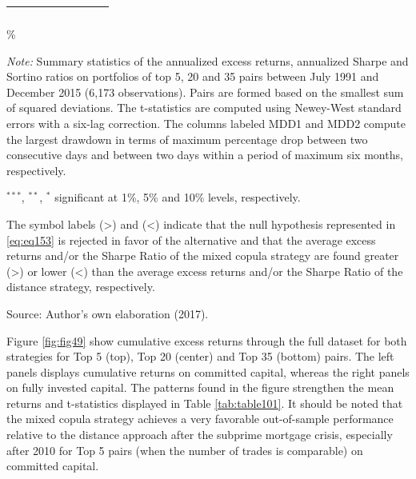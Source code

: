 \documentclass[a4paper,12pt]{report}
\begin{document}
\begin{refsection}
\begin{threeparttable}[H]
\begin{tabularx}{\textwidth}{@{\extracolsep{\fill}}llllllll@{}}
			\multicolumn{1}{r}{} & \multicolumn{1}{r}{} & \multicolumn{1}{r}{} & \multicolumn{1}{r}{} & \multicolumn{1}{r}{} & \multicolumn{1}{r}{} & \multicolumn{1}{r}{} & \multicolumn{1}{r}{} \\
			\bottomrule
		\end{tabularx}\%
		\begin{tablenotes}
			\item \textit{Note:} \scriptsize \tiny Summary statistics of the annualized excess returns, annualized Sharpe and Sortino ratios on portfolios of top 5, 20 and 35 pairs between July 1991 and December 2015 (6,173 observations). Pairs are formed based on the smallest sum of squared deviations. The t-statistics are computed using Newey-West standard errors with a six-lag correction. The columns labeled MDD1 and MDD2 compute the largest drawdown in terms of maximum percentage drop between two consecutive days and between two days within a period of maximum six months, respectively.
			\item \scriptsize $^{\ast\ast\ast}$, $^{\ast\ast}$, $^{\ast}$  significant at 1\%, 5\% and 10\% levels, respectively.
			\item \tiny The symbol labels (>) and (<) indicate that the null hypothesis represented in \ref{eq:eq153} is rejected in favor of the alternative and that the average excess returns and/or the Sharpe Ratio of the mixed copula strategy are found greater (>) or lower (<) than the average excess returns and/or the Sharpe Ratio of the distance strategy, respectively.
			\item Source: Author's own elaboration (2017).
		\end{tablenotes}
		\label{tab:table101}
	\end{threeparttable}
	
	
	\vspace{0.6cm}
	
	
	Figure \ref{fig:fig49} show cumulative excess returns through the full dataset for both strategies for Top 5 (top), Top 20 (center) and Top 35 (bottom) pairs. The left panels displays cumulative returns on committed capital, whereas the right panels on fully invested capital. The patterns found in the figure strengthen the mean returns and t-statistics displayed in Table \ref{tab:table101}. It should be noted that the mixed copula strategy achieves a very favorable out-of-sample performance relative to the distance approach after the subprime mortgage crisis, especially after 2010 for Top 5 pairs (when the number of trades is comparable) on committed capital. 
	

\end{refsection}
\end{document}
